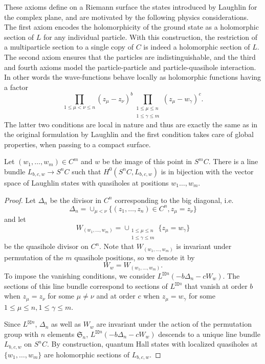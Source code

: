\documentclass{article}
\theoremstyle{definition}
\renewcommand{\leq}{\leqslant}
\begin{document}
These axioms define on a Riemann surface the states introduced by Laughlin for the complex plane, and are motivated by the following physics considerations. The first axiom encodes the holomorphicity of the ground state as a holomorphic section of $L$ for any individual particle. With this construction, the restriction of a multiparticle section to a single copy of $C$ is indeed a holomorphic section of $L$.
The second axiom ensures that the particles are indistinguishable, and the third and fourth axioms model the particle-particle and particle-quasihole interaction. In other words the wave-functions behave locally as holomorphic functions having a factor $$\prod_{1\leqslant\mu<\nu\leqslant n}(z_\mu-z_\nu)^b \prod_{\substack{1\leq \mu \leq n\\1\leq \gamma \leq m}} (z_\mu - w_\gamma)^c.$$
The latter two conditions are local in nature and thus are exactly the same as in the original formulation by Laughlin and the first condition takes care of global properties, when passing to a compact surface.

\begin{proposition}
Let $(w_1,\dots,w_m) \in C^m$ and $w$ be the image of this point in $S^m C$. There is a line bundle $L_{b,c,w }\to 
S^n C$ such that $H^0(S^{n}C,L_{b,c,w})$ is in bijection with the vector space of Laughlin states with quasiholes at positions $w_1\dots,w_m$.
\end{proposition}

\begin{proof}
Let $\Delta_n$ be the divisor in $C^n$ corresponding to the big diagonal, i.e. 
$$\Delta_n=\cup_{\mu<\nu} \lbrace (z_1,\dots,z_n) \in C^n,  z_\mu=z_\nu \rbrace$$ and let 
$$W_{(w_1,\dots,w_m)}=\cup_{\substack{1\leq \mu \leq n\\1\leq \gamma \leq m}} \lbrace z_\mu=w_\gamma \rbrace$$ be the quasihole divisor on $C^n$. Note that $W_{(w_1,\dots,w_m)}$ is invariant under permutation of the $m$ quasihole positions, so we denote it by $$W_w=W_{(w_1,\dots,w_m)}.$$
To impose the vanishing conditions, we consider $L^{\boxtimes n}(-b\Delta_n - c W_{w})$. The sections of this line bundle correspond to sections of $L^{\boxtimes n}$ that vanish at order $b$ when $z_\mu=z_\nu$ for some $\mu \neq \nu$ and at order $c$ when $z_\mu=w_\gamma$ for some $1\leq \mu \leq n,1\leq \gamma\leq m$. 

Since $L^{\boxtimes n}$, $\Delta_n$ as well as $W_{w}$ are invariant under the action of the permutation group with $n$ elements $\mathfrak{S}_n$, $L^{\boxtimes n}(-b\Delta_n - c W_{w})$ descends to a unique line bundle $L_{b,c,w}$ on $S^n C$. By construction, quantum Hall states with localized quasiholes at $\{w_1,\dots,w_m\}$ are holomorphic sections of $L_{b,c,w}$. 
\end{proof}
\end{document}
